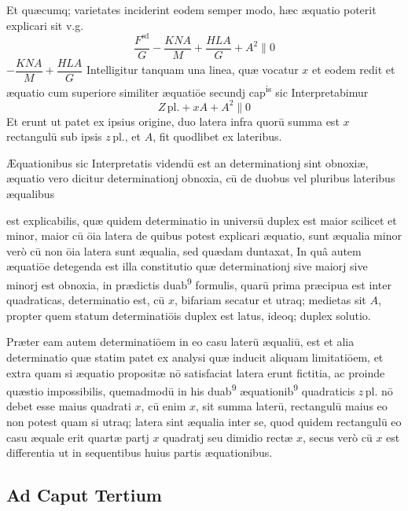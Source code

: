 \documentclass[11pt,a4paper]{article}
\begin{document}
Et quæcumq; varietates inciderint eodem semper modo, hæc æquatio poterit explicari sit  v.g.
\[ \frac{F^{\mathrm{sd}}}{G} - \frac{KNA}{M} + \frac{HLA}{G} + A^{2} \parallel 0 \]
$-\dfrac{KNA}{M} + \dfrac{HLA}{G}$ Intelligitur tanquam una linea, quæ vocatur $x$ et eodem redit et æquatio cum superiore similiter æquatiōe secundj cap\textsuperscript{is} sic Interpretabimur
\[ Z\,\mathrm{pl.} + xA + A^{2} \parallel 0 \]
Et erunt ut patet ex ipsius origine, duo latera infra quorū summa est $x$ rectangulū sub ipsis $z\,\mathrm{pl.}$, et $A$, fit quodlibet ex lateribus.

Æquationibus sic Interpretatis videndū est an determinationj sint obnoxiæ, æquatio vero dicitur determinationj obnoxia, cū de duobus vel pluribus lateribus æqualibus


est explicabilis, quæ quidem determinatio in universū duplex est maior scilicet et minor, maior cū ōia latera de quibus potest explicari æquatio, sunt æqualia minor verò cū non ōia latera sunt æqualia, sed quædam duntaxat, In quâ autem æquatiōe detegenda est illa constitutio quæ determinationj sive maiorj sive minorj est obnoxia, in prædictis duab\textsuperscript{9} formulis, quarū prima præcipua est inter quadraticas, determinatio est, cū $x$, bifariam secatur et utraq; medietas sit $A$, propter quem statum determinatiōis duplex est latus, ideoq; duplex solutio.

Præter eam autem determinatiōem in eo casu laterū æqualiū, est et alia determinatio quæ statim patet ex analysi quæ inducit aliquam limitatiōem, et extra quam si æquatio propositæ nō satisfaciat latera erunt fictitia, ac proinde quæstio impossibilis, quemadmodū in his duab\textsuperscript{9} æquationib\textsuperscript{9} quadraticis $z\,\mathrm{pl.}$ nō debet esse maius  quadrati $x$, cū enim $x$, sit summa laterū, rectangulū maius eo non potest quam si utraq; latera sint æqualia inter se, quod quidem rectangulū eo casu æquale erit quartæ partj $x$ quadratj seu dimidio rectæ $x$, secus verò cū $x$ est differentia ut in sequentibus huius partis æquationibus.

\subsection*{Ad Caput Tertium}
\end{document}
